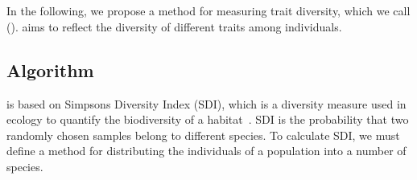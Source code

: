 \section{\di{}}\label{sec:nntd}
In the following, we propose a method for measuring trait diversity, which we call \emph{\di{}} (\dia). \dia{} aims to reflect the diversity of different traits among individuals. 

\subsection{Algorithm}
\dia{} is based on Simpsons Diversity Index (SDI), which is a diversity measure used in ecology to quantify the biodiversity of a habitat~\cite{simpson1949measurement}. SDI is the probability that two randomly chosen samples belong to different species\cite{Venturi2007182}. To calculate SDI, we must define a method for distributing the individuals of a population into a number of species.

